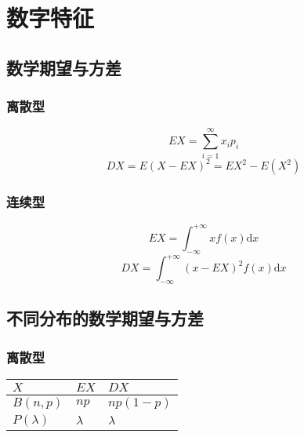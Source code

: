 

\section{数字特征}

\subsection{数学期望与方差}

\subsubsection{离散型}


\begin{equation*}
  EX=\sum\limits_{i=1}^{\infty} x_{i} p_{i}
\end{equation*}
\begin{equation*}
  DX=E(X-EX)^{2}=EX^{2}-E(X^{2})
\end{equation*}

\subsubsection{连续型}
\begin{equation*}
  EX=\int_{-\infty}^{+\infty} x f(x) \mathrm{d} x
\end{equation*}
\begin{equation*}
  DX=\int_{-\infty}^{+\infty} (x-EX)^{2} f(x) \mathrm{d} x
\end{equation*}



\subsection{不同分布的数学期望与方差}

\subsubsection{离散型}


\begin{table}[H]
  \renewcommand\arraystretch{1.5}
  \begin{tabular}{|l|l|l|}
    \hline
    $X$&$EX$&$DX$\\
    \hline
    $B(n,p)$&$np$&$np(1-p)$\\
    \hline
    $P(\lambda)$&$\lambda$&$\lambda$\\
    \hline
  \end{tabular}
\end{table}

